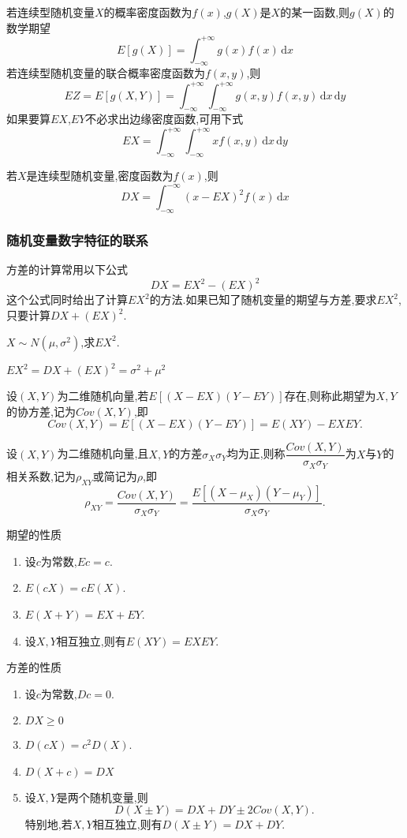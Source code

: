     若连续型随机变量$X$的概率密度函数为$f(x)$,$g(X)$是$X$的某一函数,则$g(X)$的数学期望\[
    E[g(X)]=\int_{-\infty}^{+\infty}g(x)f(x)  \,\mathrm{d} x \]
    若连续型随机变量的联合概率密度函数为$f(x,y)$,则\[
        EZ=E[g(X,Y)]=\int_{-\infty}^{+\infty}\int_{-\infty}^{+\infty}g(x,y)f(x,y)  \,\mathrm{d} x\,\mathrm{d} y\]如果要算$EX$,$EY$不必求出边缘密度函数,可用下式\[
        EX=\int_{-\infty}^{+\infty}\int_{-\infty}^{+\infty}xf(x,y)  \,\mathrm{d} x\,\mathrm{d} y\]

    若$X$是连续型随机变量,密度函数为$f(x)$,则\[DX=\int_{-\infty}^{-\infty}(x-EX)^2f(x)  \,\mathrm{d} x \]

\subsubsection{随机变量数字特征的联系}

方差的计算常用以下公式
\begin{equation*}
    DX=EX^2-(EX)^2
\end{equation*}
这个公式同时给出了计算$EX^2$的方法.如果已知了随机变量的期望与方差,要求$EX^2$,只要计算$DX+(EX)^2$.

\begin{examp}{$X\sim N(\mu,\sigma^2)$,求$EX^2$.}

    \jie $EX^2=DX+(EX)^2=\sigma^2+\mu^2$
\end{examp}

\begin{definition}
    设$(X,Y)$为二维随机向量,若$E[(X-EX)(Y-EY)]$存在,则称此期望为$X,Y$的协方差,记为$Cov(X,Y)$,即\[
    Cov(X,Y)=E[(X-EX)(Y-EY)]=E(XY)-EXEY.
    \]
\end{definition}
\begin{definition}
    设$(X,Y)$为二维随机向量,且$X,Y$的方差$\sigma_X\sigma_Y$均为正,则称$\dfrac{Cov(X,Y)}{\sigma_X\sigma_Y}$为$X$与$Y$的相关系数,记为$\rho _{XY}$或简记为$\rho $,即\[
    \rho _{XY}=\frac{Cov(X,Y)}{\sigma_X\sigma_Y}=\frac{E[(X-\mu_X)(Y-\mu_Y)]}{\sigma_X\sigma_Y}.
    \]    
\end{definition}
期望的性质
    \begin{enumerate}
        \item 设$c$为常数,$Ec=c$.
        \item $E(cX)=cE(X)$.
        \item $E(X+Y)=EX+EY$.
        \item 设$X,Y$相互独立,则有$E(XY)=EXEY$.
    \end{enumerate}

方差的性质
    \begin{enumerate}
        \item 设$c$为常数,$Dc=0$.
        \item $DX \geqslant 0$
        \item $D(cX)=c^2D(X)$.
        \item $D(X+c)=DX$
        \item 设$X,Y$是两个随机变量,则\[D(X\pm Y)=DX+DY\pm 2Cov(X,Y).\]特别地,若$X,Y$相互独立,则有$D(X\pm Y)=DX+DY$.
    \end{enumerate}

